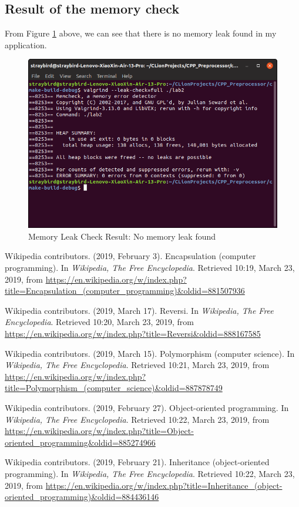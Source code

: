 \documentclass[a4paper]{report}
\begin{document}
\subsection{Result of the memory check}
From Figure \ref{4} above, we can see that there is no memory leak found in my application.
\begin{figure}
  \centering
  \includegraphics[width=12cm]{mem.png}
  \caption{Memory Leak Check Result: No memory leak found}\label{4}
\end{figure}
\begin{thebibliography}{A}

Wikipedia contributors. (2019, February 3). Encapsulation (computer programming). In \emph{Wikipedia, The Free Encyclopedia}. Retrieved 10:19, March 23, 2019, from \url{https://en.wikipedia.org/w/index.php?title=Encapsulation_(computer_programming)&oldid=881507936}

Wikipedia contributors. (2019, March 17). Reversi. In \emph{Wikipedia, The Free Encyclopedia}. Retrieved 10:20, March 23, 2019, from \url{https://en.wikipedia.org/w/index.php?title=Reversi&oldid=888167585}

Wikipedia contributors. (2019, March 15). Polymorphism (computer science). In \emph{Wikipedia, The Free Encyclopedia}. Retrieved 10:21, March 23, 2019, from \url{https://en.wikipedia.org/w/index.php?title=Polymorphism_(computer_science)&oldid=887878749}

Wikipedia contributors. (2019, February 27). Object-oriented programming. In \emph{Wikipedia, The Free Encyclopedia}. Retrieved 10:22, March 23, 2019, from \url{https://en.wikipedia.org/w/index.php?title=Object-oriented_programming&oldid=885274966}

Wikipedia contributors. (2019, February 21). Inheritance (object-oriented programming). In \emph{Wikipedia, The Free Encyclopedia}. Retrieved 10:22, March 23, 2019, from \url{https://en.wikipedia.org/w/index.php?title=Inheritance_(object-oriented_programming)&oldid=884436146}

\end{thebibliography}
\end{document}
